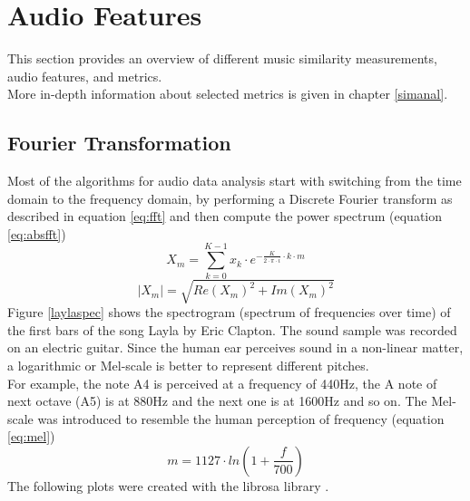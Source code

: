 \section{Audio Features}

This section provides an overview of different music similarity measurements, audio features, and metrics.\\
More in-depth information about selected metrics is given in chapter \ref{simanal}.

\subsection{Fourier Transformation}\label{featsec}

Most of the algorithms for audio data analysis start with switching from the time domain to the frequency domain, by performing a Discrete Fourier transform as described in equation \ref{eq:fft} and then compute the power spectrum (equation \ref{eq:absfft}) 
\begin{equation} \label{eq:fft}
X_m = \sum_{k=0}^{K-1}{x_k \cdot e^ { - \frac{K}{ 2 \cdot \pi \cdot i}\cdot k\cdot m}}
\end{equation}
\begin{equation} \label{eq:absfft}
|X_m| = \sqrt{Re(X_m)^2 + Im(X_m)^2}
\end{equation}
Figure \ref{laylaspec} shows the spectrogram (spectrum of frequencies over time) of the first bars of the song Layla by Eric Clapton. The sound sample was recorded on an electric guitar. Since the human ear perceives sound in a non-linear matter, a logarithmic or Mel-scale is better to represent different pitches.\\ 
For example, the note A4 is perceived at a frequency of 440Hz, the A note of next octave (A5) is at 880Hz and the next one is at 1600Hz and so on. 
The Mel-scale \cite[pp. 53f]{knees1} was introduced to resemble the human perception of frequency (equation \ref{eq:mel})
\begin{equation} \label{eq:mel}
m = 1127 \cdot ln(1 + \frac{f}{700})
\end{equation}
The following plots were created with the librosa library \cite{librosa1}.

